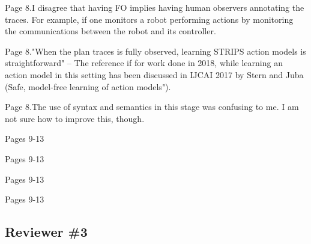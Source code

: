 \documentclass{article}
\begin{document}
\begin{mdframed}[hidealllines=true,backgroundcolor=gray!20]
  Page 8.I disagree that having FO implies having human observers annotating the traces. For example, if one monitors a robot performing actions by monitoring the communications between the robot and its controller.
\end{mdframed}

\begin{mdframed}[hidealllines=true,backgroundcolor=gray!20]
  Page 8."When the plan traces is fully observed, learning STRIPS action models is straightforward" – The reference if for work done in 2018, while learning an action model in this setting has been discussed in IJCAI 2017 by Stern and Juba (Safe, model-free learning of action models").
\end{mdframed}

\begin{mdframed}[hidealllines=true,backgroundcolor=gray!20]
  Page 8.The use of syntax and semantics in this stage was confusing to me. I am not sure how to improve this, though.
\end{mdframed}

\begin{mdframed}[hidealllines=true,backgroundcolor=gray!20]
  Pages 9-13
\end{mdframed}

\begin{mdframed}[hidealllines=true,backgroundcolor=gray!20]
  Pages 9-13
\end{mdframed}

\begin{mdframed}[hidealllines=true,backgroundcolor=gray!20]
   Pages 9-13
\end{mdframed}

\begin{mdframed}[hidealllines=true,backgroundcolor=gray!20]
   Pages 9-13
\end{mdframed}

\begin{mdframed}[hidealllines=true,backgroundcolor=gray!20]
\end{mdframed}

\begin{mdframed}[hidealllines=true,backgroundcolor=gray!20]
\end{mdframed}



\subsection*{Reviewer \#3}
\end{document}
